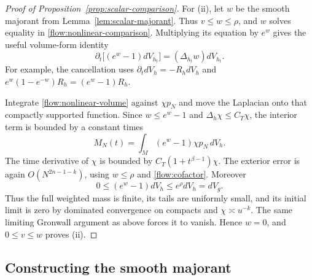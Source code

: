 \begin{proof}[Proof of Proposition~\ref{prop:scalar-comparison}]
For \textup{(ii)}, let $w$ be the smooth majorant from
Lemma~\ref{lem:scalar-majorant}.  Thus $v\le w\le\rho$, and $w$
solves equality in \eqref{flow:nonlinear-comparison}.
Multiplying its equation by $e^w$ gives the useful
volume-form identity
\begin{equation}\label{flow:nonlinear-volume}
 \partial_t\bigl[(e^w-1)dV_{h_t}\bigr]
                    =(\Delta_{h_t}w)dV_{h_t}.
\end{equation}
For example, the cancellation uses
$\partial_tdV_h=-R_hdV_h$ and
$e^w(1-e^{-w})R_h=(e^w-1)R_h$.

Integrate \eqref{flow:nonlinear-volume} against $\chi p_N$ and
move the Laplacian onto that compactly supported function.  Since
$w\le e^w-1$ and $\Delta_h\chi\le C_T\chi$, the interior term is
bounded by a constant times
\[
 M_N(t)=\int_M(e^w-1)\chi p_N\,dV_h.
\]
The time derivative of $\chi$ is bounded by
$C_T(1+t^{\beta-1})\chi$.  The exterior error is again
$O(N^{2n-1-k})$, using $w\le\rho$ and
\eqref{flow:cofactor}.  Moreover
\[
 0\le(e^w-1)dV_h\le e^\rho dV_h=dV_g.
\]
Thus the full weighted mass is finite, its tails are uniformly
small, and its initial limit is zero by dominated convergence on
compacts and $\chi\asymp u^{-k}$.  The same limiting Gronwall
argument as above forces it to vanish.  Hence $w=0$, and $0\le v\le w$
proves \textup{(ii)}.
\end{proof}

\subsection{Constructing the smooth majorant}

